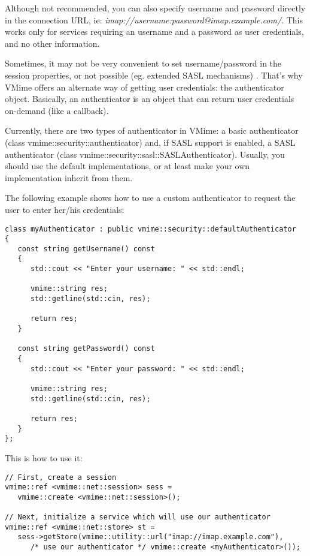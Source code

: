 Although not recommended, you can also specify username and password
directly in the connection URL,
ie: \emph{imap://username:password@imap.example.com/}. This works only for
services requiring an username and a password as user credentials, and no
other information.

Sometimes, it may not be very convenient to set username/password in the
session properties, or not possible (eg. extended SASL mechanisms) . That's
why VMime offers an alternate way of getting user credentials: the
{\vcode authenticator} object. Basically, an authenticator is an object that
can return user credentials on-demand (like a callback).

Currently, there are two types of authenticator in VMime: a basic
authenticator (class {\vcode vmime::security::authenticator}) and, if SASL
support is enabled, a SASL authenticator
(class {\vcode vmime::security::sasl::SASLAuthenticator}). Usually, you
should use the default implementations, or at least make your own
implementation inherit from them.

The following example shows how to use a custom authenticator to request
the user to enter her/his credentials:

\begin{lstlisting}[caption={A simple interactive authenticator}]
class myAuthenticator : public vmime::security::defaultAuthenticator
{
   const string getUsername() const
   {
      std::cout << "Enter your username: " << std::endl;

      vmime::string res;
      std::getline(std::cin, res);

      return res;
   }

   const string getPassword() const
   {
      std::cout << "Enter your password: " << std::endl;

      vmime::string res;
      std::getline(std::cin, res);

      return res;
   }
};
\end{lstlisting}

This is how to use it:

\begin{lstlisting}
// First, create a session
vmime::ref <vmime::net::session> sess =
   vmime::create <vmime::net::session>();

// Next, initialize a service which will use our authenticator
vmime::ref <vmime::net::store> st =
   sess->getStore(vmime::utility::url("imap://imap.example.com"),
      /* use our authenticator */ vmime::create <myAuthenticator>());
\end{lstlisting}

